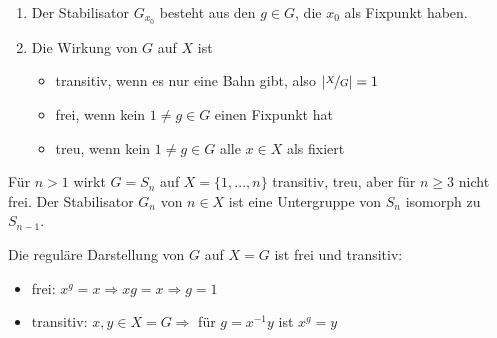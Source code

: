 \begin{remark}
	\begin{enumerate}[label=(\alph*)]
		\item Der Stabilisator $G_{x_0}$ besteht aus den $g\in G$, die $x_0$ als Fixpunkt haben.
		\item Die Wirkung von $G$ auf $X$ ist
		\begin{itemize}
			\item transitiv, wenn es nur eine Bahn gibt, also $\vert\nicefrac{X}{G}\vert = 1$
			\item frei, wenn kein $1\neq g\in G$ einen Fixpunkt hat
			\item treu, wenn kein $1\neq g\in G$ alle $x\in X$ als fixiert
		\end{itemize}
	\end{enumerate}
\end{remark}

\begin{example}
	Für $n>1$ wirkt $G=S_n$ auf $X=\{1,...,n\}$ transitiv, treu, aber für $n\ge 3$ nicht frei. Der Stabilisator $G_n$ von $n\in X$ ist eine Untergruppe von $S_n$ isomorph zu $S_{n-1}$.
\end{example}

\begin{example}
	Die reguläre Darstellung von $G$ auf $X=G$ ist frei und transitiv:
	\begin{itemize}
		\item frei: $x^g=x\Rightarrow xg=x\Rightarrow g=1$
		\item transitiv: $x,y\in X=G\Rightarrow$ für $g=x^{-1}y$ ist $x^g=y$
	\end{itemize}
\end{example}
